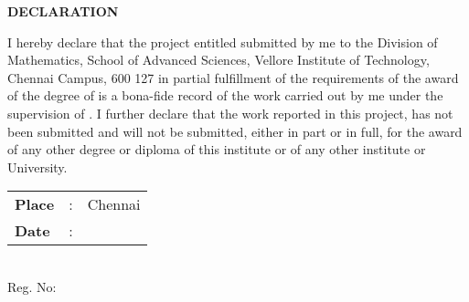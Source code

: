 \thispagestyle{plain}

\begin{center}
{\Large \bf DECLARATION}\\[0.75cm]
\end{center}


I hereby declare that the project entitled 
{\bf \printtitle} 
submitted by me to the Division of Mathematics, School of Advanced Sciences, Vellore Institute of Technology, Chennai Campus, 600 127 
in partial fulfillment of the requirements of the award of the degree of {\bf \theprogramme} 
is a bona-fide record of the work  
carried out by me under the supervision of {\bf \theguide}. 
I further declare that 
the work reported in this project, has not been submitted and will not be submitted,
either in part or in full, for the award of any other degree or diploma of this
institute or of any other institute or University.

%

%
%

\vspace{3\baselineskip}

\begin{minipage}{.5\textwidth}
	\raggedright
	\begin{tabular}{lcl}
		\textbf{Place}  & : & Chennai \\
		\textbf{Date} & : &
	\end{tabular}
\end{minipage}%
\begin{minipage}{.5\textwidth}
	\raggedleft
	\thestudent\\
	Reg. No: \theregno\\
\end{minipage}

\cleardoublepage


%
%  



